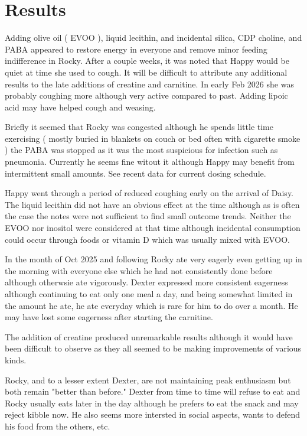 \section{ Results }

Adding  olive oil ( EVOO ), liquid lecithin, 
and incidental silica, CDP choline,
and PABA appeared to restore energy in  everyone
and remove minor feeding indifference
in Rocky.  After a couple weeks, it was noted that Happy would be quiet
at time she used to cough. It will be difficult to attribute
any additional results to the late additions of creatine and carnitine. 
In early Feb 2026 she  was probably coughing more although very
active compared to past. Adding lipoic acid may have helped
cough and weasing. 

Briefly it seemed that Rocky was congested although he spends
little time exercising ( mostly buried in blankets
on couch or bed often with cigarette smoke )
 the PABA was stopped as it was the most
suspicious for infection such as pneumonia. Currently he seems fine 
witout it
although Happy may benefit from intermittent small amounts.
See recent data for current dosing schedule. 

Happy went through a period of reduced coughing early on the arrival
of Daisy. The liquid lecithin did not have an obvious
effect at the time although as is often the case  the 
notes were not sufficient to find small outcome trends.  
Neither the EVOO nor inositol were considered at that time
although incidental consumption could occur through foods or vitamin
D which was usually mixed with EVOO. 

In the month of Oct 2025 and following Rocky ate very eagerly even
getting up in the morning with everyone else which he had not 
consistently done before although otherwsie ate vigorously.
Dexter expressed more consistent eagerness although continuing to
eat only one meal a day, and being somewhat limited
in the amount he ate,  he ate everyday which is rare for him to do
over a month.  He may have lost some eagerness after starting the
carnitine.
 
The addition of creatine produced unremarkable results although
it would have been difficult to observe as they all seemed to
be making improvements of various kinds. 

Rocky, and to a lesser extent Dexter, are not maintaining
peak enthusiasm but both remain "better than before."
Dexter from time to time will refuse to eat and Rocky usually
eats later in the day although he prefers to eat the snack
and may reject kibble now. He also seems more intersted
in social aspects, wants to defend his food from the others, etc. 

